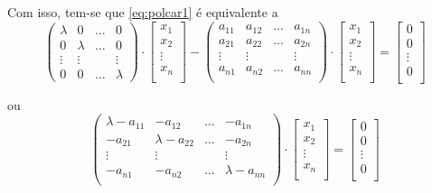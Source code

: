 Com isso, tem-se que \eqref{eq:polcar1} é equivalente a
$$
\begin{pmatrix}\lambda & 0 & \dots & 0\\0 & \lambda & \dots & 0\\ \vdots & \vdots & & \vdots\\0 & 0 & \dots & \lambda \end{pmatrix}\cdot\begin{bmatrix}x_1\\x_2\\ \vdots\\x_n\\ \end{bmatrix}-\begin{pmatrix}a_{11} & a_{12} & \dots & a_{1n}\\a_{21} & a_{22} & \dots & a_{2n}\\ \vdots & \vdots & & \vdots\\a_{n1} & a_{n2} & \dots & a_{nn}\\ \end{pmatrix}\cdot\begin{bmatrix}x_1\\x_2\\ \vdots\\x_n\\ \end{bmatrix}=\begin{bmatrix}0\\0\\ \vdots\\0\\ \end{bmatrix}$$

ou
\begin{equation} \label{eq:polcar2}
\begin{pmatrix}\lambda-a_{11} & -a_{12} & \dots & -a_{1n}\\-a_{21} & \lambda-a_{22} & \dots & -a_{2n}\\ \vdots & \vdots & & \vdots\\-a_{n1} & -a_{n2} & \dots & \lambda-a_{nn}\\ \end{pmatrix}\cdot\begin{bmatrix}x_1\\x_2\\ \vdots\\x_n\\ \end{bmatrix}=\begin{bmatrix}0\\0\\ \vdots\\0\\ \end{bmatrix}
\end{equation}

